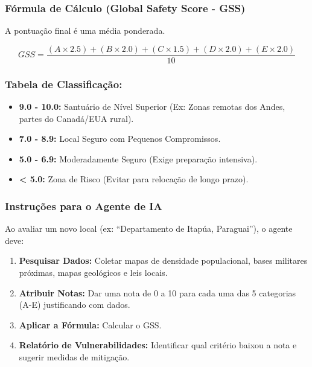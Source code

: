 \subsubsection{Fórmula de Cálculo (Global Safety Score -
GSS)}\label{fuxf3rmula-de-cuxe1lculo-global-safety-score---gss}

A pontuação final é uma média ponderada.

\[GSS = \frac{(A \times 2.5) + (B \times 2.0) + (C \times 1.5) + (D \times 2.0) + (E \times 2.0)}{10}\]

\subsubsection{Tabela de
Classificação:}\label{tabela-de-classificauxe7uxe3o}

\begin{itemize}
\tightlist
\item
  \textbf{9.0 - 10.0:} Santuário de Nível Superior (Ex: Zonas remotas
  dos Andes, partes do Canadá/\allowbreak \allowbreak EUA rural).
\item
  \textbf{7.0 - 8.9:} Local Seguro com Pequenos Compromissos.
\item
  \textbf{5.0 - 6.9:} Moderadamente Seguro (Exige preparação intensiva).
\item
  \textbf{\textless{} 5.0:} Zona de Risco (Evitar para relocação de
  longo prazo).
\end{itemize}

\subsubsection{Instruções para o Agente de
IA}\label{instruuxe7uxf5es-para-o-agente-de-ia}

Ao avaliar um novo local (ex: ``Departamento de Itapúa, Paraguai''), o
agente deve:

\begin{enumerate}
\def\labelenumi{\arabic{enumi}.}
\tightlist
\item
  \textbf{Pesquisar Dados:} Coletar mapas de densidade populacional,
  bases militares próximas, mapas geológicos e leis locais.
\item
  \textbf{Atribuir Notas:} Dar uma nota de 0 a 10 para cada uma das 5
  categorias (A-E) justificando com dados.
\item
  \textbf{Aplicar a Fórmula:} Calcular o GSS.
\item
  \textbf{Relatório de Vulnerabilidades:} Identificar qual critério
  baixou a nota e sugerir medidas de mitigação.
\end{enumerate}
